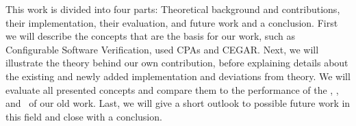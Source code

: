 This work is divided into four parts: Theoretical background and contributions, their implementation, their evaluation, and future work and a conclusion.
First we will describe the concepts that are the basis for our work, such as Configurable Software Verification, used CPAs and CEGAR.
Next, we will illustrate the theory behind our own contribution,
before explaining details about the existing and newly added implementation and deviations from theory.
We will evaluate all presented concepts and compare them to the performance of the , \predicateCPA, and \symbolicExecutionCPA\ of our old work.
Last, we will give a short outlook to possible future work in this field and close with a conclusion.
